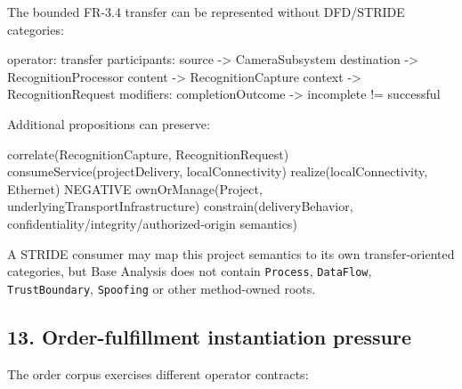 \documentclass[
  10pt,
  letterpaper,
]{article}
\newenvironment{Shaded}{}{}
\newcommand{\NormalTok}[1]{#1}
\begin{document}
The bounded FR-3.4 transfer can be represented without DFD/STRIDE
categories:

\begin{Shaded}
\begin{Highlighting}[]
\NormalTok{operator: transfer}
\NormalTok{participants:}
\NormalTok{  source      {-}\textgreater{} CameraSubsystem}
\NormalTok{  destination {-}\textgreater{} RecognitionProcessor}
\NormalTok{  content     {-}\textgreater{} RecognitionCapture}
\NormalTok{  context     {-}\textgreater{} RecognitionRequest}
\NormalTok{modifiers:}
\NormalTok{  completionOutcome {-}\textgreater{} incomplete != successful}
\end{Highlighting}
\end{Shaded}

Additional propositions can preserve:

\begin{Shaded}
\begin{Highlighting}[]
\NormalTok{correlate(RecognitionCapture, RecognitionRequest)}
\NormalTok{consumeService(projectDelivery, localConnectivity)}
\NormalTok{realize(localConnectivity, Ethernet)}
\NormalTok{NEGATIVE ownOrManage(Project, underlyingTransportInfrastructure)}
\NormalTok{constrain(deliveryBehavior, confidentiality/integrity/authorized{-}origin semantics)}
\end{Highlighting}
\end{Shaded}

A STRIDE consumer may map this project semantics to its own
transfer-oriented categories, but Base Analysis does not contain
\texttt{Process}, \texttt{DataFlow}, \texttt{TrustBoundary},
\texttt{Spoofing} or other method-owned roots.

\subsection{13. Order-fulfillment instantiation
pressure}\label{order-fulfillment-instantiation-pressure}

The order corpus exercises different operator contracts:
\end{document}
